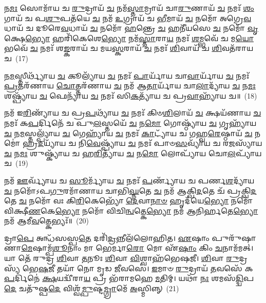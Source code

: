 {\anuvakamend[{\-\ul{𑌵𑍈}\-\-\ul{𑌶}\-𑌨𑍍𑌤𑌾𑌯᳴ 𑌚 \ul{𑌤𑍍𑌰𑌿}\-\-\ul{𑍞}\-𑌶𑌚𑍍𑌚᳴}]}%

𑌨\-\ul{𑌮𑌃} 𑌸𑍋𑌮𑌾᳴𑌯 𑌚 \ul{𑌰𑍁}\-𑌦𑍍𑌰𑌾𑌯᳴ \ul{𑌚} 𑌨𑌮᳴\-\ul{𑌸𑍍𑌤𑌾}\-𑌮𑍍𑌰𑌾𑌯᳴ 𑌚𑌾\-\ul{𑌰𑍁}\-𑌣𑌾𑌯᳴ \ul{𑌚} 𑌨𑌮𑌃᳴ \ul{𑌶𑌂}\-𑌗𑌾𑌯᳴ 𑌚 𑌪\-\ul{𑌶𑍁}\-𑌪𑌤᳴𑌯𑍇 \ul{𑌚} 𑌨𑌮᳴ \ul{𑌉}\-𑌗𑍍𑌰𑌾𑌯᳴ 𑌚 \ul{𑌭𑍀}\-𑌮𑌾𑌯᳴ \ul{𑌚} 𑌨𑌮𑍋᳴ 𑌅𑌗𑍍𑌰𑍇\-\ul{𑌵}\-𑌧𑌾𑌯᳴ 𑌚 𑌦𑍂𑌰𑍇\-\ul{𑌵}\-𑌧𑌾𑌯᳴ \ul{𑌚} 𑌨𑌮𑍋᳴ \ul{𑌹}\-𑌨𑍍𑌤𑍍𑌰𑍇 \ul{𑌚} 𑌹𑌨𑍀᳴𑌯𑌸𑍇 \ul{𑌚} 𑌨𑌮𑍋᳴ \ul{𑌵𑍃}\-𑌕𑍍𑌷𑍇\-\ul{𑌭𑍍𑌯𑍋} 𑌹𑌰𑌿᳴𑌕𑍇𑌶𑍇\-\ul{𑌭𑍍𑌯𑍋} 𑌨𑌮᳴\-\ul{𑌸𑍍𑌤𑌾}\-𑌰𑌾\-\ul{𑌯} 𑌨𑌮𑌃᳴ \ul{𑌶}\-𑌮𑍍𑌭𑌵𑍇᳴ 𑌚 𑌮\-\ul{𑌯𑍋}\-𑌭𑌵𑍇᳴ \ul{𑌚} 𑌨𑌮𑌃᳴ 𑌶\-\ul{𑌙𑍍𑌕}\-𑌰𑌾𑌯᳴ 𑌚 𑌮𑌯\-\ul{𑌸𑍍𑌕}\-𑌰𑌾𑌯᳴ \ul{𑌚} 𑌨𑌮𑌃᳴ \ul{𑌶𑌿}\-𑌵𑌾𑌯᳴ 𑌚 \ul{𑌶𑌿}\-𑌵𑌤᳴𑌰𑌾𑌯 𑌚~(17)

𑌨\-\ul{𑌮}\-𑌸𑍍𑌤𑍀𑌰𑍍𑌥𑍍𑌯𑌾᳴𑌯 \ul{𑌚} 𑌕𑍂𑌲𑍍𑌯𑌾᳴𑌯 \ul{𑌚} 𑌨𑌮𑌃᳴ \ul{𑌪𑌾}\-𑌰𑍍𑌯𑌾᳴𑌯 𑌚𑌾\-\ul{𑌵𑌾}\-𑌰𑍍𑌯𑌾᳴𑌯 \ul{𑌚} 𑌨𑌮𑌃᳴ \ul{𑌪𑍍𑌰}\-𑌤𑌰᳴𑌣𑌾𑌯 \ul{𑌚𑍋}\-𑌤𑍍𑌤𑌰᳴𑌣𑌾𑌯 \ul{𑌚} 𑌨𑌮᳴ 𑌆\-\ul{𑌤𑌾}\-𑌰𑍍𑌯𑌾᳴𑌯 𑌚𑌾\-\ul{𑌲𑌾}\-𑌦𑍍𑌯𑌾᳴𑌯 \ul{𑌚} 𑌨\-\ul{𑌮𑌃} 𑌶𑌷𑍍𑌪𑍍𑌯𑌾᳴𑌯 \ul{𑌚} 𑌫𑍇𑌨𑍍𑌯𑌾᳴𑌯 \ul{𑌚} 𑌨𑌮𑌃᳴ 𑌸𑌿\-\ul{𑌕}\-𑌤𑍍𑌯𑌾᳴𑌯 𑌚 𑌪𑍍𑌰\-\ul{𑌵𑌾}\-𑌹𑍍𑌯𑌾᳴𑌯 𑌚॥~(18)

{\anuvakamend[{\-\ul{𑌶𑌿}\-𑌵𑌤᳴𑌰𑌾𑌯 𑌚 \ul{𑌤𑍍𑌰𑌿}\-\-\ul{𑍞}\-𑌶𑌚𑍍𑌚᳴}]}%

𑌨𑌮᳴ 𑌇\-\ul{𑌰𑌿}\-𑌣𑍍𑌯𑌾᳴𑌯 𑌚 𑌪𑍍𑌰\-\ul{𑌪}\-𑌥𑍍𑌯𑌾᳴𑌯 \ul{𑌚} 𑌨𑌮𑌃᳴ 𑌕𑌿𑍞\-\ul{𑌶𑌿}\-𑌲𑌾𑌯᳴ \ul{𑌚} 𑌕𑍍𑌷𑌯᳴𑌣𑌾𑌯 \ul{𑌚} 𑌨𑌮𑌃᳴ 𑌕\-\ul{𑌪}\-𑌰𑍍𑌦𑌿𑌨𑍇᳴ 𑌚 𑌪𑍁\-\ul{𑌲}\-𑌸𑍍𑌤𑌯𑍇᳴ \ul{𑌚} 𑌨\-\ul{𑌮𑍋} 𑌗𑍋𑌷𑍍𑌠𑍍𑌯𑌾᳴𑌯 \ul{𑌚} 𑌗𑍃𑌹𑍍𑌯𑌾᳴𑌯 \ul{𑌚} 𑌨\-\ul{𑌮}\-𑌸𑍍𑌤𑌲𑍍𑌪𑍍𑌯𑌾᳴𑌯 \ul{𑌚} 𑌗𑍇𑌹𑍍𑌯𑌾᳴𑌯 \ul{𑌚} 𑌨𑌮𑌃᳴ \ul{𑌕𑌾}\-𑌟𑍍𑌯𑌾᳴𑌯 𑌚 𑌗𑌹𑍍𑌵\-\ul{𑌰𑍇}\-𑌷𑍍𑌠𑌾𑌯᳴ \ul{𑌚} 𑌨𑌮𑍋॑ 𑌹𑍍𑌰\-\ul{𑌦}\-𑌯𑍍𑌯𑌾᳴𑌯 𑌚 𑌨𑌿\-\ul{𑌵𑍇}\-𑌷𑍍𑌪𑍍𑌯𑌾᳴𑌯 \ul{𑌚} 𑌨𑌮𑌃᳴ 𑌪𑌾𑍞\-\ul{𑌸}\-𑌵𑍍𑌯𑌾᳴𑌯 𑌚 𑌰\-\ul{𑌜}\-𑌸𑍍𑌯𑌾᳴𑌯 \ul{𑌚} 𑌨\-\ul{𑌮𑌃} 𑌶𑍁𑌷𑍍𑌕𑍍𑌯𑌾᳴𑌯 𑌚 𑌹\-\ul{𑌰𑌿}\-𑌤𑍍𑌯𑌾᳴𑌯 \ul{𑌚} 𑌨\-\ul{𑌮𑍋} 𑌲𑍋𑌪𑍍𑌯𑌾᳴𑌯 𑌚𑍋\-\ul{𑌲}\-𑌪𑍍𑌯𑌾᳴𑌯 𑌚~(19)

𑌨𑌮᳴ \ul{𑌊}\-𑌰𑍍𑌵𑍍𑌯𑌾᳴𑌯 𑌚 \ul{𑌸𑍂}\-𑌰𑍍𑌮𑍍𑌯𑌾᳴𑌯 \ul{𑌚} 𑌨𑌮𑌃᳴ \ul{𑌪}\-𑌰𑍍𑌣𑍍𑌯𑌾᳴𑌯 𑌚 𑌪𑌰𑍍𑌣\-\ul{𑌶}\-𑌦𑍍𑌯𑌾᳴𑌯 \ul{𑌚} 𑌨𑌮𑍋᳴\-𑌽𑌪\-\ul{𑌗𑍁}\-𑌰𑌮𑌾᳴𑌣𑌾𑌯 𑌚𑌾𑌭𑌿\-\ul{𑌘𑍍𑌨}\-𑌤𑍇 \ul{𑌚} 𑌨𑌮᳴ 𑌆𑌕𑍍𑌖𑌿\-\ul{𑌦}\-𑌤𑍇 𑌚᳴ 𑌪𑍍𑌰𑌕𑍍𑌖𑌿\-\ul{𑌦}\-𑌤𑍇 \ul{𑌚} 𑌨𑌮𑍋᳴ 𑌵𑌃 𑌕𑌿\-\ul{𑌰𑌿}\-𑌕𑍇𑌭𑍍𑌯𑍋᳴ \ul{𑌦𑍇}\-𑌵𑌾\-\ul{𑌨𑌾}\-\-\ul{𑍞} 𑌹𑍃𑌦᳴𑌯𑍇\-\ul{𑌭𑍍𑌯𑍋} 𑌨𑌮𑍋᳴ 𑌵𑌿𑌕𑍍𑌷𑍀\-\ul{𑌣}\-𑌕𑍇\-\ul{𑌭𑍍𑌯𑍋} 𑌨𑌮𑍋᳴ 𑌵𑌿𑌚𑌿\-\ul{𑌨𑍍𑌵}\-𑌤𑍍𑌕𑍇\-\ul{𑌭𑍍𑌯𑍋} 𑌨𑌮᳴ 𑌆𑌨𑌿𑌰𑍍\mbox{}\-\ul{𑌹}\-𑌤𑍇\-\ul{𑌭𑍍𑌯𑍋} 𑌨𑌮᳴ 𑌆𑌮𑍀\-\ul{𑌵}\-𑌤𑍍𑌕𑍇𑌭𑍍𑌯𑌃᳴॥~(20)

{\anuvakamend[{\-\ul{𑌉}\-\-\ul{𑌲}\-𑌪𑍍𑌯𑌾᳴𑌯 \ul{𑌚} 𑌤𑍍𑌰𑌯᳴𑌸𑍍𑌤𑍍𑌰𑌿𑍞𑌶𑌚𑍍𑌚}]}%

𑌦𑍍𑌰𑌾\-\ul{𑌪𑍇} 𑌅𑌨𑍍𑌧᳴𑌸𑌸𑍍𑌪\-\ul{𑌤𑍇} 𑌦𑌰𑌿᳴\-\ul{𑌦𑍍𑌰}\-𑌨𑍍𑌨𑍀𑌲᳴𑌲𑍋𑌹𑌿𑌤। \ul{𑌏}\-𑌷𑌾𑌂 𑌪𑍁𑌰𑍁᳴𑌷𑌾𑌣𑌾\-\ul{𑌮𑍇}\-𑌷𑌾𑌮𑍍𑌪᳴\-\ul{𑌶𑍂}\-𑌨𑌾𑌂 𑌮𑌾 𑌭𑍇𑌰𑍍𑌮𑌾\-\ul{𑌰𑍋} 𑌮𑍋 𑌏᳴\-\ul{𑌷𑌾𑌂} 𑌕𑌿𑌂 \ul{𑌚}\-𑌨𑌾𑌮᳴𑌮𑌤𑍍। 𑌯𑌾 𑌤𑍇᳴ 𑌰𑍁𑌦𑍍𑌰 \ul{𑌶𑌿}\-𑌵𑌾 \ul{𑌤}\-𑌨𑍂𑌃 \ul{𑌶𑌿}\-𑌵𑌾 \ul{𑌵𑌿}\-𑌶𑍍𑌵𑌾𑌹᳴𑌭𑍇𑌷𑌜𑍀। \ul{𑌶𑌿}\-𑌵𑌾 \ul{𑌰𑍁}\-𑌦𑍍𑌰𑌸𑍍𑌯᳴ 𑌭𑍇\-\ul{𑌷}\-𑌜𑍀 𑌤𑌯𑌾᳴ 𑌨𑍋 𑌮𑍃𑌡 \ul{𑌜𑍀}\-𑌵𑌸𑍇॑। \ul{𑌇}\-𑌮𑌾𑍞 \ul{𑌰𑍁}\-𑌦𑍍𑌰𑌾𑌯᳴ \ul{𑌤}\-𑌵𑌸𑍇᳴ 𑌕\-\ul{𑌪}\-𑌰𑍍𑌦𑌿𑌨𑍇॑ \ul{𑌕𑍍𑌷}\-𑌯𑌦𑍍𑌵𑍀᳴𑌰𑌾\-\ul{𑌯} 𑌪𑍍𑌰 𑌭᳴𑌰𑌾𑌮𑌹𑍇 \ul{𑌮}\-𑌤𑌿𑌮𑍍। 𑌯𑌥𑌾᳴ \ul{𑌨𑌃} 𑌶𑌮𑌸᳴\-\ul{𑌦𑍍𑌦𑍍𑌵𑌿}\-𑌪\-\ul{𑌦𑍇} 𑌚𑌤𑍁᳴𑌷𑍍𑌪\-\ul{𑌦𑍇} 𑌵𑌿𑌶𑍍𑌵᳴\-\ul{𑌮𑍍𑌪𑍁}\-𑌷𑍍𑌟\-\ul{𑌮𑍍𑌗𑍍𑌰𑌾}\-𑌮𑍇᳴ \ul{𑌅}\-𑌸𑍍𑌮𑌿𑌨𑍍𑌨𑍍~(21)

